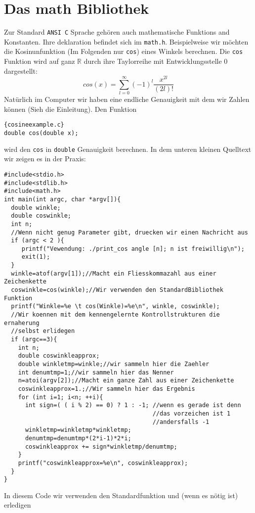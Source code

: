 \section{Das math Bibliothek}
Zur Standard \texttt{ANSI C} Sprache gehören auch mathematische Funktions and Konstanten.
Ihre deklaration befindet sich im \texttt{math.h}. Beispielweise wir möchten 
die Kosinunfunktion (Im Folgenden nur \texttt{cos}) eines Winkels berechnen.
Die \texttt{cos} Funktion wird auf ganz $\mathbb{R}$ durch ihre 
Taylorreihe mit Entwicklungsstelle 0 dargestellt:
\begin{equation}
cos\left(x\right)=\sum_{l=0}^{\infty} \left(-1\right)^{l} \dfrac{x^{2l}}{\left(2l\right)!}
\end{equation}
Natürlich im Computer wir haben eine endliche Genauigkeit mit dem wir Zahlen können
(Sieh die Einleitung). Den Funktion 
\begin{lstlisting}{cosineexample.c}
double cos(double x);
\end{lstlisting}
wird den \texttt{cos} in \texttt{double} Genauigkeit berechnen.
In dem unteren kleinen Quelltext wir zeigen es in der Praxis:
\begin{lstlisting}
#include<stdio.h>
#include<stdlib.h>
#include<math.h>
int main(int argc, char *argv[]){
  double winkle;
  double coswinkle;
  int n;
  //Wenn nicht genug Parameter gibt, druecken wir einen Nachricht aus
  if (argc < 2 ){
     printf("Vewendung: ./print_cos angle [n]; n ist freiwillig\n");
     exit(1);
  }
  winkle=atof(argv[1]);//Macht ein Fliesskommazahl aus einer Zeichenkette
  coswinkle=cos(winkle);//Wir verwenden den StandardBibliothek Funktion
  printf("Winkle=%e \t cos(Winkle)=%e\n", winkle, coswinkle);
  //Wir koennen mit dem kennengelernte Kontrollstrukturen die ernaherung
  //selbst erlidegen
  if (argc==3){
    int n;
    double coswinkleapprox;
    double winkletmp=winkle;//wir sammeln hier die Zaehler
    int denumtmp=1;//wir sammeln hier das Nenner
    n=atoi(argv[2]);//Macht ein ganze Zahl aus einer Zeichenkette
    coswinkleapprox=1.;//Wir sammeln hier das Ergebnis
    for (int i=1; i<n; ++i){
      int sign=( ( i % 2) == 0) ? 1 : -1; //wenn es gerade ist denn
                                          //das vorzeichen ist 1
                                          //andersfalls -1
      winkletmp=winkletmp*winkletmp;
      denumtmp=denumtmp*(2*i-1)*2*i;
      coswinkleapprox += sign*winkletmp/denumtmp;
    }
    printf("coswinkleapprox=%e\n", coswinkleapprox);
  }
}
\end{lstlisting}
In diesem Code wir verwenden den Standardfunktion und (wenn es nötig ist) erledigen
